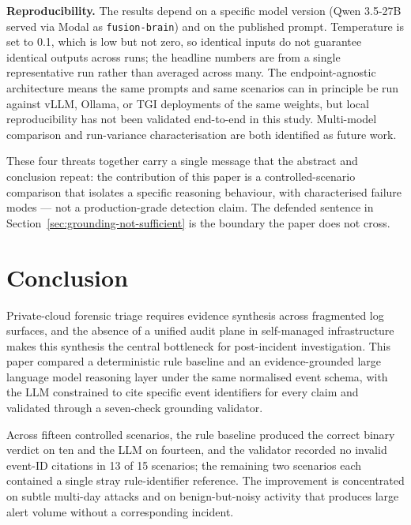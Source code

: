 \documentclass[conference]{IEEEtran}
\begin{document}
\textbf{Reproducibility.} The results depend on a specific model version (Qwen 3.5-27B served via Modal as \texttt{fusion-brain}) and on the published prompt. Temperature is set to 0.1, which is low but not zero, so identical inputs do not guarantee identical outputs across runs; the headline numbers are from a single representative run rather than averaged across many. The endpoint-agnostic architecture means the same prompts and same scenarios can in principle be run against vLLM, Ollama, or TGI deployments of the same weights, but local reproducibility has not been validated end-to-end in this study. Multi-model comparison and run-variance characterisation are both identified as future work.

These four threats together carry a single message that the abstract and conclusion repeat: the contribution of this paper is a controlled-scenario comparison that isolates a specific reasoning behaviour, with characterised failure modes --- not a production-grade detection claim. The defended sentence in Section~\ref{sec:grounding-not-sufficient} is the boundary the paper does not cross.

\section{Conclusion}
\label{sec:conclusion}

Private-cloud forensic triage requires evidence synthesis across fragmented log surfaces, and the absence of a unified audit plane in self-managed infrastructure makes this synthesis the central bottleneck for post-incident investigation. This paper compared a deterministic rule baseline and an evidence-grounded large language model reasoning layer under the same normalised event schema, with the LLM constrained to cite specific event identifiers for every claim and validated through a seven-check grounding validator.

Across fifteen controlled scenarios, the rule baseline produced the correct binary verdict on ten and the LLM on fourteen, and the validator recorded no invalid event-ID citations in 13 of 15 scenarios; the remaining two scenarios each contained a single stray rule-identifier reference. The improvement is concentrated on subtle multi-day attacks and on benign-but-noisy activity that produces large alert volume without a corresponding incident.
\end{document}
